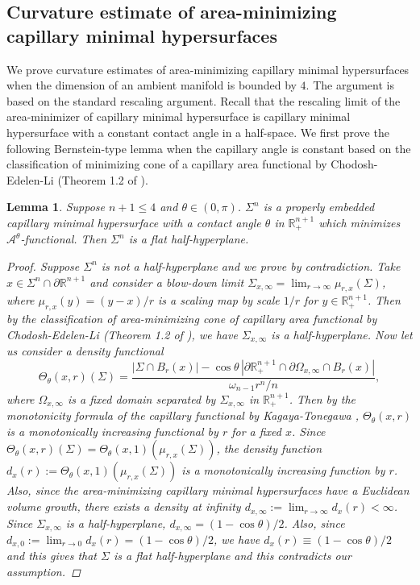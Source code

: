 \documentclass[11pt,letterpaper]{amsart}
\newtheorem{lem}{Lemma}[section]
\begin{document}
\subsection{Curvature estimate of area-minimizing capillary minimal hypersurfaces} We prove curvature estimates of area-minimizing capillary minimal hypersurfaces when the dimension of an ambient manifold is bounded by $4$. The argument is based on the standard rescaling argument. Recall that the rescaling limit of the area-minimizer of capillary minimal hypersurface is capillary minimal hypersurface with a constant contact angle in a half-space. We first prove the following Bernstein-type lemma when the capillary angle is constant based on the classification of minimizing cone of a capillary area functional by Chodosh-Edelen-Li (Theorem 1.2 of \cite{chodosh2024improved}).
\begin{lem} \label{capillarybernstein}
    Suppose $n+1 \le 4$ and $\theta \in (0,\pi)$. $\Sigma^{n}$ is a properly embedded capillary minimal hypersurface with a contact angle $\theta$ in $\mathbb{R}^{n+1}_{+}$ which minimizes $\mathcal{A}^{\theta}$-functional. Then $\Sigma^{n}$ is a flat half-hyperplane.  
    \begin{proof} Suppose $\Sigma^{n}$ is not a half-hyperplane and we prove by contradiction. Take $x \in \Sigma^{n} \cap \partial \mathbb{R}^{n+1}$ and consider a blow-down limit $\Sigma_{x,\infty} = \lim_{r \rightarrow \infty} \mu_{r,x} (\Sigma)$, where $\mu_{r,x}(y) = (y-x)/r$ is a scaling map by scale $1/r$ for $y \in \mathbb{R}^{n+1}_{+}$. Then by the classification of area-minimizing cone of capillary area functional by Chodosh-Edelen-Li (Theorem 1.2 of \cite{chodosh2024improved}), we have $\Sigma_{x,\infty}$ is a half-hyperplane. Now let us consider a density functional
    \begin{equation*}
        \Theta_{\theta}(x,r)(\Sigma) = \frac{|\Sigma \cap B_{r}(x)| - \cos \theta \,|\partial \mathbb{R}^{n+1}_{+} \cap \partial \Omega_{x,\infty} \cap B_{r}(x)|}{ \omega_{n-1}r^{n}/n},
    \end{equation*}
    where $\Omega_{x,\infty}$ is a fixed domain separated by $\Sigma_{x,\infty}$ in $\mathbb{R}^{n+1}_{+}$. Then by the monotonicity formula of the capillary functional by Kagaya-Tonegawa \cite{kagaya2017fixed}, $\Theta_{\theta}(x,r)$ is a monotonically increasing functional by $r$ for a fixed $x$. Since $\Theta_{\theta}(x,r)(\Sigma)=  \Theta_{\theta}(x,1)(\mu_{r,x} (\Sigma))$, the density function $d_{x}(r) :=  \Theta_{\theta}(x,1)(\mu_{r,x} (\Sigma))$ is a monotonically increasing function by $r$. Also, since the area-minimizing capillary minimal hypersurfaces have a Euclidean volume growth, there exists a density at infinity $d_{x,\infty} := \lim_{r \rightarrow \infty} d_{x}(r) < \infty$. Since $\Sigma_{x,\infty}$ is a half-hyperplane, $d_{x,\infty} = (1- \cos \theta)/2$. Also, since $d_{x,0} := \lim_{r \rightarrow 0} d_{x}(r) = (1- \cos \theta)/2$, we have $d_{x}(r) \equiv (1- \cos \theta)/2$ and this gives that $\Sigma$ is a flat half-hyperplane and this contradicts our assumption.
    \end{proof}
\end{lem}
\end{document}
